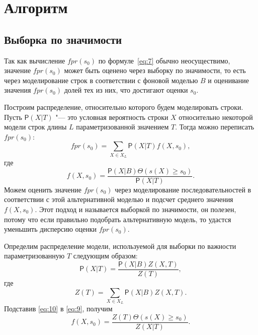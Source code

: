 \documentclass[specialist,
substylefile = spbu_report.rtx,
subf,href,colorlinks=true, 12pt]{disser}
\begin{document}
		\section{Алгоритм}
			\subsection{Выборка по значимости}
				Так как вычисление $fpr(s_{0})$ по формуле~\eqref{eq:7} обычно неосуществимо, значение $fpr(s_{0})$ может быть оценено через выборку по значимости, то есть через моделирование строк в соответствии с фоновой моделью $B$ и оценивание значения $fpr(s_{0})$ долей тех из них, что достигают оценки $s_{0}$.
				
				Построим распределение, относительно которого будем моделировать строки. Пусть $\mathsf{P}(X|T)$ "--- это условная вероятность строки $X$ относительно некоторой модели строк длины $L$ параметризованной значением $T$. Тогда можно переписать $fpr(s_{0})$:
				\begin{equation*}
					fpr(s_{0}) = \sum_{X \in X_{L}} \mathsf{P}(X|T) f(X,s_{0}),
					\label{eq:8}
				\end{equation*}
				где
				\begin{equation}
					f(X,s_{0}) = \frac{\mathsf{P}(X|B) \Theta(s(X) \geq s_{0})}{\mathsf{P}(X|T)}.
					\label{eq:9}
				\end{equation}
				Можем оценить значение $fpr(s_{0})$ через моделирование последовательностей в соответствии с этой альтернативной моделью и подсчет среднего значения $f(X,s_{0})$. Этот подход и называется выборкой по значимости, он полезен, потому что если правильно подобрать альтернативную модель, то удастся уменьшить дисперсию оценки $fpr(s_{0})$.
					
				Определим распределение модели, используемой для выборки по важности параметризованную $T$ следующим образом:
				\begin{equation}
					\mathsf{P}(X|T) = \frac{\mathsf{P}(X|B)Z(X,T)}{Z(T)},
					\label{eq:10}
				\end{equation}							
				где 
				\begin{equation}
					Z(T) = \sum_{X \in X_{L}}\mathsf{P}(X|B)Z(X,T).
					\label{eq:11}
				\end{equation}	
				Подставив \eqref{eq:10} в \eqref{eq:9}, получим 
				\begin{equation*}
					f(X,s_{0}) = \frac{Z(T)\Theta(s(X) \geq s_{0})}{Z(X|T)}.
					\label{eq:12}
				\end{equation*}		
		
\end{document}
